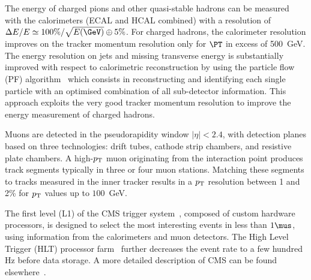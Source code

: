 The energy of charged pions and other quasi-stable hadrons can be measured with 
the calorimeters (ECAL and HCAL combined) with a resolution of 
$\Delta E/E \simeq 100 \%/\sqrt{E(\GeV)} \oplus 5\%$. 
For charged hadrons, the calorimeter resolution improves on the tracker momentum 
resolution only for $\PT$ in excess of 500~GeV. 
The energy resolution on jets and missing transverse energy is substantially improved with
respect to calorimetric reconstruction by using
the particle flow (PF) algorithm~\cite{PFT} which consists in reconstructing and
identifying each single particle with an optimised combination of all sub-detector
information. This approach exploits the very good tracker momentum resolution
to improve the energy measurement of charged hadrons.

\par
Muons are detected in the pseudorapidity window $|\eta|< 2.4$, with
detection planes based on three technologies: drift tubes, cathode strip
chambers, and resistive plate chambers.  A high-$p_{\mathrm{T}}$ muon originating
from the interaction point produces track segments typically
in three or four muon stations.  Matching these segments to tracks
measured in the inner tracker results in a $p_{\mathrm{T}}$ resolution
between 1 and 2\% for $p_{\mathrm{T}}$ values up to $100$~GeV.
\par
The first level (L1) of the CMS trigger system~\cite{cmsTrigger}, composed of custom
hardware processors, is designed to select the most interesting events
in less than $1\mus$,
using information from the calorimeters
and muon detectors. The High Level Trigger (HLT) processor farm~\cite{HLT} further
decreases the event rate
to a few hundred Hz before data storage. 
A more detailed description of CMS can be found elsewhere~\cite{JINST}.




